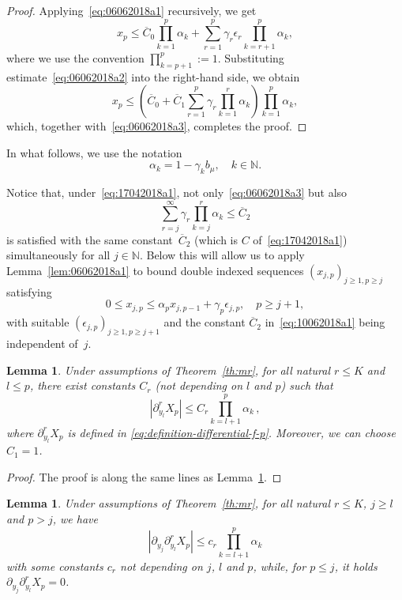 \documentclass[article]{elsarticle}
\newtheorem{lem}[thm]{Lemma}
\newcommand*{\ol}{\overline}
\begin{document}
\begin{proof}
Applying~\eqref{eq:06062018a1} recursively, we get
$$
x_p\le\ol C_0\prod_{k=1}^p \alpha_k
+\sum_{r=1}^p \gamma_r\epsilon_r
\prod_{k=r+1}^p \alpha_k,
$$
where we use the convention $\prod_{k=p+1}^p:=1$.
Substituting estimate~\eqref{eq:06062018a2}
into the right-hand side, we obtain
$$
x_p\le\left(\ol C_0+\ol C_1
\sum_{r=1}^p \gamma_r \prod_{k=1}^r \alpha_k
\right)
\prod_{k=1}^p \alpha_k,
$$
which, together with~\eqref{eq:06062018a3}, completes the proof.
\end{proof}

In what follows, we use the notation
\begin{equation}
\label{eq:definition-alpha}
\alpha_k=1-\gamma_k b_\mu,\quad k\in\mathbb N.
\end{equation}

\begin{remark}\label{rem:10062018a1}
Notice that, under~\eqref{eq:17042018a1},
not only~\eqref{eq:06062018a3} but also
\begin{equation}\label{eq:10062018a1}
\sum_{r=j}^\infty\gamma_r \prod_{k=j}^r \alpha_k\le\ol C_2
\end{equation}
is satisfied with the same constant~$\ol C_2$
(which is $C$ of~\eqref{eq:17042018a1})
simultaneously for all $j\in\mathbb N$.
Below this will allow us to apply
Lemma~\ref{lem:06062018a1}
to bound double indexed sequences
$(x_{j,p})_{j\ge1,p\ge j}$
satisfying
$$
0\le x_{j,p}\le\alpha_p x_{j,p-1}+\gamma_p \epsilon_{j,p},\quad p\ge j+1,
$$
with suitable $(\epsilon_{j,p})_{j\ge1,p\ge j+1}$
and the constant $\ol C_2$ in~\eqref{eq:10062018a1}
being independent of~$j$.
\end{remark}

\begin{lem}\label{lem:06062018a2}
Under assumptions of Theorem~\ref{th:mr},
for all natural $r\le K$ and $l\le p$, there exist constants $C_r$ (not depending on $l$ and $p$) such that
\begin{equation}
\label{eq:08062018b2}
\left|\partial_{y_l}^r X_p \right| \le C_r\prod_{k=l+1}^p \alpha_k \,,
\end{equation}
where $\partial_{y_l}^r X_p$ is defined in \eqref{eq:definition-differential-f-p}. Moreover, we can choose $C_1=1$.
\end{lem}
\begin{proof}
The proof is along the same lines as Lemma~\ref{lem:06062018a3}.
\end{proof}
\begin{lem}\label{lem:06062018a3}
Under assumptions of Theorem~\ref{th:mr},
for all natural $r\le K$, $j\ge l$ and $p>j$, we have
\begin{equation}\label{eq:08062018b3}
\left|\partial_{y_j} \partial_{y_l}^r X_p\right|
\le c_r\prod_{k=l+1}^p \alpha_k
\end{equation}
with some constants $c_r$
not depending on $j$, $l$ and $p$,
while, for $p\le j$, it holds
$\partial_{y_{j}}\partial_{y_{l}}^{r}X_{p}=0$.
\end{lem}
\end{document}
